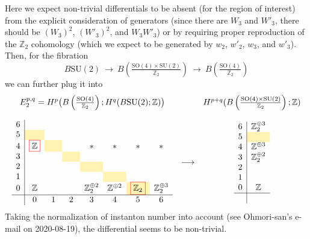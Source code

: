 \documentclass[12pt]{article}
\numberwithin{equation}{section}
\newcommand*{\red}[1]{\textcolor{red}{#1}}
\newcommand*{\black}[1]{\textcolor{black}{#1}}
\def\bZ{\mathbb{Z}}
\def\SU{\mathrm{SU}}
\def\SO{\mathrm{SO}}
\begin{document}
Here we expect non-trivial differentials to be absent (for the region of interest)
from the explicit consideration of generators (since there are $W_3$ and $W'_3$, there should be $(W_3)^2$, $(W'_3)^2$, and $W_3W'_3$)
or by requiring proper reproduction of the $\bZ_2$ cohomology (which we expect to be generated by $w_2$, $w'_2$, $w_3$, and $w'_3$).
Then, for the fibration
\begin{equation}
	B\SU(2)
	\ \to\ 
	B\left(\tfrac{\SO(4)\times \SU(2)}{\bZ_2}\right)
	\ \to\ 
	B\left(\tfrac{\SO(4)}{\bZ_2}\right)
\end{equation}
we can further plug it into
\begin{equation}
	\begin{array}{ccc}
		E_2^{p,q}=H^p\big(B\left(\tfrac{\SO(4)}{\bZ_2}\right);H^q(B\SU(2);\bZ)\big) && H^{p+q}(B\left(\tfrac{\SO(4)\times \SU(2)}{\bZ_2}\right);\bZ)\vspace{4mm}\\
		\begin{array}{c|ccccccccccccc}
			6  &&&&&& \\
			5  & \cellcolor{lightyellow} & \hphantom{\bZ_2} & \hphantom{\bZ_2} & \hphantom{\bZ_2} & \hphantom{\bZ_2} & \hphantom{\bZ_2} \\
			4  & \red{\fbox{\black{$\bZ$}}} & \cellcolor{lightyellow} && \ast & \ast & \ast & \ast\\
			3  &  && \cellcolor{lightyellow} &&&\\
			2  &&  && \cellcolor{lightyellow} &&\\
			1  &  &&  && \cellcolor{lightyellow} &&\\
			0 & \bZ &  && \bZ_2^{\oplus 2} & \bZ^{\oplus 2} & \red{\fbox{\black{$\bZ_2$}}}\cellcolor{lightyellow} & \bZ_2^{\oplus 3}\\
			\hline
			& 0 & 1 & 2 & 3 & 4 & 5 & 6 \\
		\end{array}
		& \longrightarrow & 
		\begin{array}{c|c}
			6  & \bZ_2^{\oplus 3}\\
			5  & \cellcolor{lightyellow}\\
			4  & \bZ^{\oplus 3}\\
			3  & \bZ_2^{\oplus 2}\\
			2  & \\
			1  & \\
			0 & \bZ\\
			\hline\\
		\end{array}
	\end{array}
\end{equation}
Taking the normalization of instanton number into account (see Ohmori-san's e-mail on 2020-08-19),
the differential \red{\fbox{\black{$d_2 : E_{0,4} \to E_{5,0}$}}} seems to be non-trivial.
\end{document}
